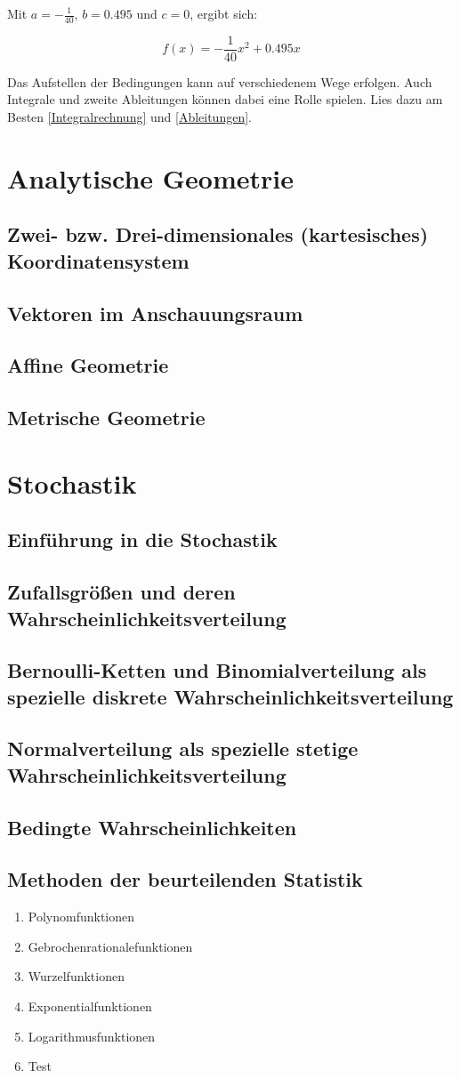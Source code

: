 \documentclass{article}
\begin{document}
Mit $a=-\frac{1}{40}$, $b=0.495$ und $c=0$, ergibt sich:

\[f(x)=-\frac{1}{40}x^2+0.495x\]

Das Aufstellen der Bedingungen kann auf verschiedenem Wege erfolgen. Auch Integrale und zweite Ableitungen können dabei eine Rolle spielen.
Lies dazu am Besten \ref{Integralrechnung} und \ref{Ableitungen}.

\section{Analytische Geometrie}
\subsection{Zwei- bzw. Drei-dimensionales (kartesisches) Koordinatensystem}
\subsection{Vektoren im Anschauungsraum}
\subsection{Affine Geometrie}
\subsection{Metrische Geometrie}

\section{Stochastik}
\subsection{Einführung in die Stochastik}
\subsection{Zufallsgrößen und deren Wahrscheinlichkeitsverteilung}
\subsection{Bernoulli-Ketten und Binomialverteilung als spezielle diskrete Wahrscheinlichkeitsverteilung}
\subsection{Normalverteilung als spezielle stetige Wahrscheinlichkeitsverteilung}
\subsection{Bedingte Wahrscheinlichkeiten}
\subsection{Methoden der beurteilenden Statistik}


\begin{enumerate}
    \item Polynomfunktionen
    \item Gebrochenrationalefunktionen
    \item Wurzelfunktionen
    \item Exponentialfunktionen
    \item Logarithmusfunktionen
    \item Test
\end{enumerate}
\end{document}
